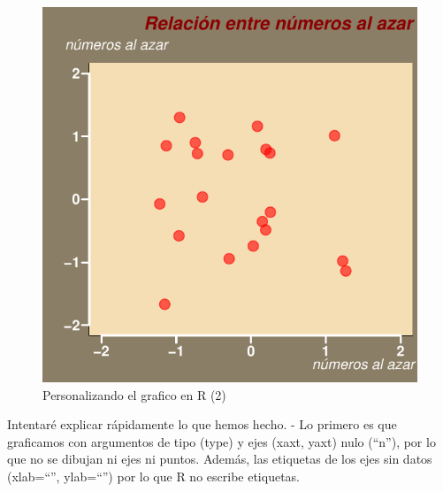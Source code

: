 \documentclass[]{article}
\begin{document}
\begin{figure}

{\centering \includegraphics{index_files/figure-latex/unnamed-chunk-12-1} 

}

\caption{Personalizando el grafico en R (2)}\label{fig:unnamed-chunk-12}
\end{figure}

Intentaré explicar rápidamente lo que hemos hecho. - Lo primero es que
graficamos con argumentos de tipo (type) y ejes (xaxt, yaxt) nulo
(``n''), por lo que no se dibujan ni ejes ni puntos. Además, las
etiquetas de los ejes sin datos (xlab=``'', ylab=``'') por lo que R no
escribe etiquetas.
\end{document}
